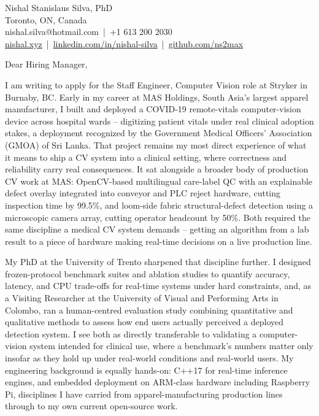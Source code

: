 \documentclass[11pt]{article}
\begin{document}
\pagestyle{empty}

\noindent Nishal Stanislaus Silva, PhD \\
Toronto, ON, Canada \\
nishal.silva@hotmail.com \,|\, +1 613 200 2030 \\
\href{https://nishal.xyz}{nishal.xyz} \,|\, \href{https://www.linkedin.com/in/nishal-silva}{linkedin.com/in/nishal-silva} \,|\, \href{https://github.com/ns2max}{github.com/ns2max}

\vspace{1em}

\noindent Dear Hiring Manager,

\vspace{0.5em}

\noindent I am writing to apply for the Staff Engineer, Computer Vision role at Stryker in Burnaby, BC. Early in my career at MAS Holdings, South Asia's largest apparel manufacturer, I built and deployed a COVID-19 remote-vitals computer-vision device across hospital wards -- digitizing patient vitals under real clinical adoption stakes, a deployment recognized by the Government Medical Officers' Association (GMOA) of Sri Lanka. That project remains my most direct experience of what it means to ship a CV system into a clinical setting, where correctness and reliability carry real consequences. It sat alongside a broader body of production CV work at MAS: OpenCV-based multilingual care-label QC with an explainable defect overlay integrated into conveyor and PLC reject hardware, cutting inspection time by 99.5\%, and loom-side fabric structural-defect detection using a microscopic camera array, cutting operator headcount by 50\%. Both required the same discipline a medical CV system demands -- getting an algorithm from a lab result to a piece of hardware making real-time decisions on a live production line.

\vspace{0.5em}

\noindent My PhD at the University of Trento sharpened that discipline further. I designed frozen-protocol benchmark suites and ablation studies to quantify accuracy, latency, and CPU trade-offs for real-time systems under hard constraints, and, as a Visiting Researcher at the University of Visual and Performing Arts in Colombo, ran a human-centred evaluation study combining quantitative and qualitative methods to assess how end users actually perceived a deployed detection system. I see both as directly transferable to validating a computer-vision system intended for clinical use, where a benchmark's numbers matter only insofar as they hold up under real-world conditions and real-world users. My engineering background is equally hands-on: C++17 for real-time inference engines, and embedded deployment on ARM-class hardware including Raspberry Pi, disciplines I have carried from apparel-manufacturing production lines through to my own current open-source work.
\end{document}
